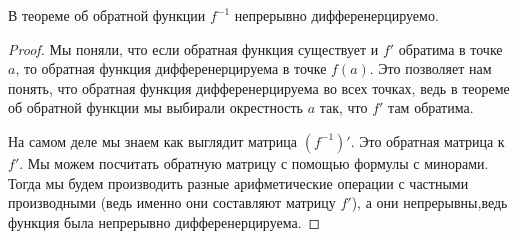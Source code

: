 \begin{follow}
    В теореме об обратной функции $f^{-1}$ непрерывно дифференерцируемо.
\end{follow}
\begin{proof}
    Мы поняли, что если обратная функция существует и $f'$ обратима в точке $a$, то обратная функция дифференерцируема в точке $f(a)$.
    Это позволяет нам понять, что обратная функция дифференерцируема во всех точках, ведь в теореме об обратной функции мы выбирали окрестность $a$ так, что $f'$ там обратима.
    
    \quad На самом деле мы знаем как выглядит матрица $(f^{-1})'$.
    Это обратная матрица к $f'$.
    Мы можем посчитать обратную матрицу с помощью формулы с минорами.
    Тогда мы будем производить разные арифметические операции с частными производными (ведь именно они составляют матрицу $f'$), а они непрерывны,ведь функция была непрерывно дифференерцируема. 
\end{proof}

\begin{follow}
    
\end{follow}